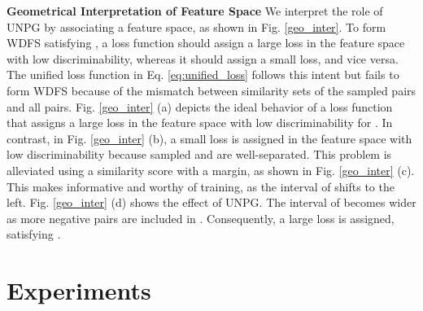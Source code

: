 \documentclass[10pt,twocolumn]{article}
\begin{document}
\noindent\textbf{Geometrical Interpretation of Feature Space} We interpret the role of UNPG by associating a feature space, as shown in Fig. \ref{geo_inter}. To form WDFS satisfying  , a loss function should assign a large loss in the feature space with low discriminability, whereas it should assign a small loss, and vice versa. The unified loss function in Eq. \ref{eq:unified_loss} follows this intent but fails to form WDFS because of the mismatch between similarity sets of the sampled pairs and all pairs. Fig. \ref{geo_inter} (a) depicts the ideal behavior of a loss function that assigns a large loss in the feature space with low discriminability for . In contrast, in Fig. \ref{geo_inter} (b), a small loss is assigned in the feature space with low discriminability because sampled  and  are well-separated. This problem is alleviated using a similarity score with a margin, as shown in Fig. \ref{geo_inter} (c). This makes  informative and worthy of training, as the interval of   shifts to the left. Fig. \ref{geo_inter} (d) shows the effect of UNPG. The interval of  becomes wider as more negative pairs are included in . Consequently, a large loss is assigned, satisfying  .

\section{Experiments}
\end{document}
